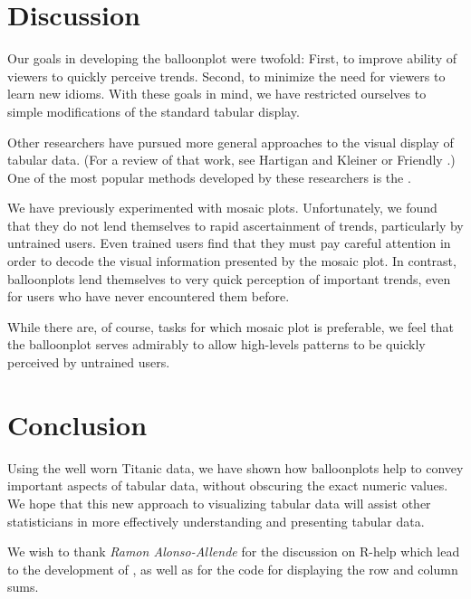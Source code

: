 \documentclass[a4paper]{report}
\begin{document}
\begin{article}
\section*{Discussion}

Our goals in developing the balloonplot were twofold: First, to
improve ability of viewers to quickly perceive trends. Second, to
minimize the need for viewers to learn new idioms.  With these goals
in mind, we have restricted ourselves to simple modifications of the
standard tabular display.  

Other researchers have pursued more general approaches to the visual
display of tabular data. (For a review of that work, see
Hartigan and Kleiner \citep{Hartigan.Kleiner.1981} or 
Friendly \citep{Friendly.1992}.)  One of the most popular methods developed by
these researchers is the  \citep{Snee.1974}.

We have previously experimented with mosaic plots.  Unfortunately,
we found that they do not lend themselves to rapid ascertainment of
trends, particularly by untrained users.  Even trained users find
that they must pay careful attention in order to decode the visual
information presented by the mosaic plot.  In contrast, balloonplots
lend themselves to very quick perception of important trends, even
for users who have never encountered them before.

While there are, of course, tasks for which mosaic plot is
preferable, we feel that the balloonplot serves admirably to allow
high-levels patterns to be quickly perceived by untrained users.

\section*{Conclusion}

Using the well worn Titanic data, we have shown how balloonplots
help to convey important aspects of tabular data, without obscuring
the exact numeric values.  We hope that this new approach to
visualizing tabular data will assist other statisticians in more
effectively understanding and presenting tabular data.


We wish to thank \emph{Ramon Alonso-Allende}
 for the discussion on R-help which lead
to the development of , as well as for the code
for displaying the row and column sums.

\address{Gregory R. Warnes, Center for Biodefense Immune Modeling, 
         Univeristy of Rochester, Rochester, NY, USA\\
\\
       Nitin Jain, Smith Hanley Inc, USA\\
}



\end{article}
\end{document}
